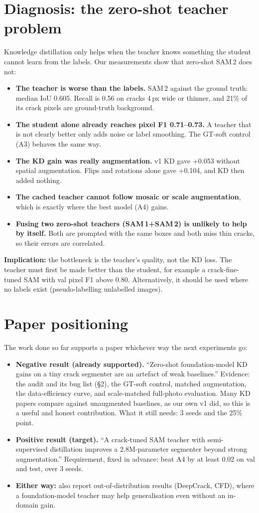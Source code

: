 \documentclass[11pt,a4paper]{article}
\begin{document}
\section{Diagnosis: the zero-shot teacher problem}
Knowledge distillation only helps when the teacher knows something the student cannot learn from the labels. Our measurements show that zero-shot SAM\,2 does not:
\begin{itemize}
\item \textbf{The teacher is worse than the labels.} SAM\,2 against the ground truth: median IoU 0.605. Recall is 0.56 on cracks 4\,px wide or thinner, and 21\% of its crack pixels are ground-truth background.
\item \textbf{The student alone already reaches pixel F1 0.71--0.73.} A teacher that is not clearly better only adds noise or label smoothing. The GT-soft control (A3) behaves the same way.
\item \textbf{The KD gain was really augmentation.} v1 KD gave +0.053 without spatial augmentation. Flips and rotations alone gave +0.104, and KD then added nothing.
\item \textbf{The cached teacher cannot follow mosaic or scale augmentation}, which is exactly where the best model (A4) gains.
\item \textbf{Fusing two zero-shot teachers (SAM\,1+SAM\,2) is unlikely to help by itself.} Both are prompted with the same boxes and both miss thin cracks, so their errors are correlated.
\end{itemize}
\textbf{Implication:} the bottleneck is the teacher's quality, not the KD loss. The teacher must first be made better than
the student, for example a crack-fine-tuned SAM with val pixel F1 above 0.80. Alternatively, it should be used where no labels exist (pseudo-labelling unlabelled images).

\section{Paper positioning}
The work done so far supports a paper whichever way the next experiments go:
\begin{itemize}
\item \textbf{Negative result (already supported).} ``Zero-shot foundation-model KD gains on a tiny crack segmenter
are an artefact of weak baselines.'' Evidence: the audit and its bug list (\S2), the GT-soft control, matched augmentation, the
data-efficiency curve, and scale-matched full-photo evaluation. Many KD papers compare against unaugmented baselines,
as our own v1 did, so this is a useful and honest contribution. What it still needs: 3 seeds and the 25\% point.
\item \textbf{Positive result (target).} ``A crack-tuned SAM teacher with semi-supervised distillation improves a 2.8M-parameter
segmenter beyond strong augmentation.'' Requirement, fixed in advance: beat A4 by at least 0.02 on val and test, over 3 seeds.
\item \textbf{Either way:} also report out-of-distribution results (DeepCrack, CFD), where a foundation-model teacher may help
generalisation even without an in-domain gain.
\end{itemize}
\end{document}
